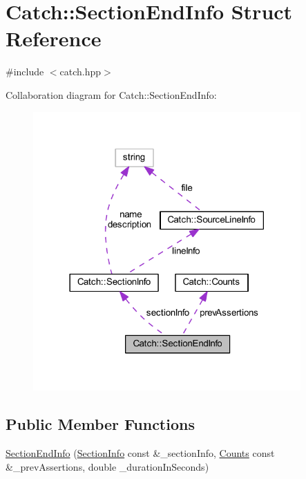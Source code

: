 \hypertarget{struct_catch_1_1_section_end_info}{}\section{Catch\+:\+:Section\+End\+Info Struct Reference}
\label{struct_catch_1_1_section_end_info}


{\ttfamily \#include $<$catch.\+hpp$>$}



Collaboration diagram for Catch\+:\+:Section\+End\+Info\+:\nopagebreak
\begin{figure}[H]
\begin{center}
\leavevmode
\includegraphics[width=290pt]{struct_catch_1_1_section_end_info__coll__graph}
\end{center}
\end{figure}
\subsection*{Public Member Functions}
\begin{DoxyCompactItemize}
\item 
\hyperlink{struct_catch_1_1_section_end_info_abc9381c7c22b6907317ec985ccaa6713}{Section\+End\+Info} (\hyperlink{struct_catch_1_1_section_info}{Section\+Info} const \&\+\_\+section\+Info, \hyperlink{struct_catch_1_1_counts}{Counts} const \&\+\_\+prev\+Assertions, double \+\_\+duration\+In\+Seconds)
\end{DoxyCompactItemize}
